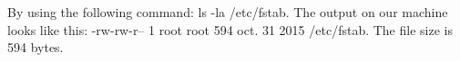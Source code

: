 By using the following command: ls -la /etc/fstab.
The output on our machine looks like this: -rw-rw-r-- 1 root root 594 oct.  31  2015 /etc/fstab.
The file size is 594 bytes.